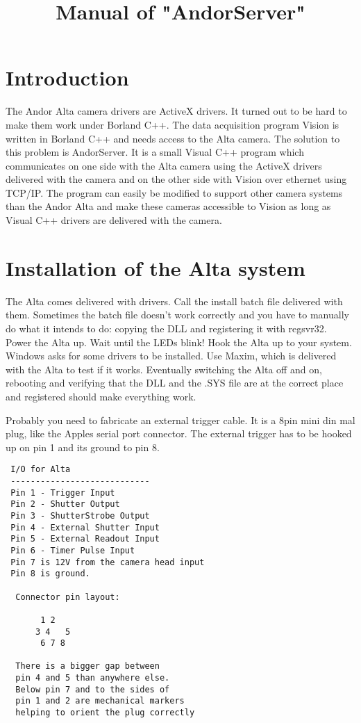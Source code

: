 \documentclass[10pt]{article}
\begin{document}
\title{Manual of "AndorServer"}

\section{Introduction}

The Andor Alta camera drivers are ActiveX drivers. It turned out
to be hard to make them work under Borland C++. The data
acquisition program Vision is written in Borland C++ and needs
access to the Alta camera. The solution to this problem is
AndorServer. It is a small Visual C++ program which communicates
on one side with the Alta camera using the ActiveX drivers
delivered with the camera and on the other side with Vision over
ethernet using TCP/IP. The program can easily be modified to
support other camera systems than the Andor Alta and make these
cameras accessible to Vision as long as Visual C++ drivers are
delivered with the camera.

\section{Installation of the Alta system}

The Alta comes delivered with drivers. Call the install batch file
delivered with them. Sometimes the batch file doesn't work
correctly and you have to manually do what it intends to do:
copying the DLL and registering it with regsvr32. Power the Alta
up. Wait until the LEDs blink! Hook the Alta up to your system.
Windows asks for some drivers to be installed. Use Maxim, which is
delivered with the Alta to test if it works. Eventually switching
the Alta off and on, rebooting and verifying that the DLL and the
.SYS file are at the correct place and registered should make
everything work.

Probably you need to fabricate an external trigger cable. It is a
8pin mini din mal plug, like the Apples serial port connector. The
external trigger has to be hooked up on pin 1 and its ground to
pin 8.

\begin{verbatim}
 I/O for Alta
 ----------------------------
 Pin 1 - Trigger Input
 Pin 2 - Shutter Output
 Pin 3 - ShutterStrobe Output
 Pin 4 - External Shutter Input
 Pin 5 - External Readout Input
 Pin 6 - Timer Pulse Input
 Pin 7 is 12V from the camera head input
 Pin 8 is ground.

  Connector pin layout:

       1 2
      3 4   5
       6 7 8

  There is a bigger gap between
  pin 4 and 5 than anywhere else.
  Below pin 7 and to the sides of
  pin 1 and 2 are mechanical markers
  helping to orient the plug correctly
\end{verbatim}
\end{document}
